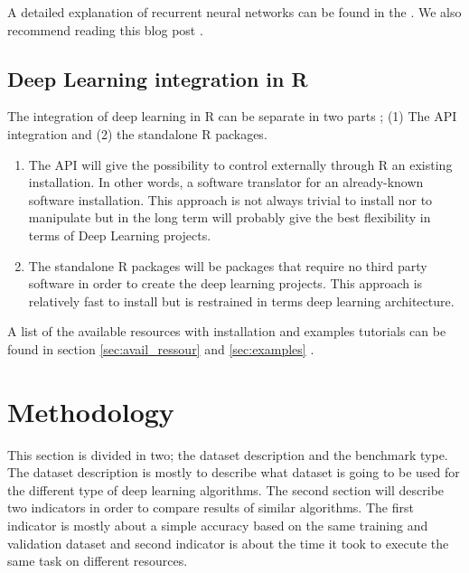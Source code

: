 \documentclass[letter,8pt]{article}\usepackage[]{graphicx}\usepackage[]{color}
\begin{document}
A detailed explanation of recurrent neural networks can be found in the  \cite[Chapter 10]{Goodfellow-et-al-2016}. We also recommend reading this blog post \cite{olah_2015}.


\subsection{Deep Learning integration in R}
\label{sec:deepinR}
The integration of deep learning in R can be separate in two parts ; (1) The API integration and (2) the standalone R packages. 
\begin{enumerate}
\item The API will give the possibility to control externally through R an existing installation. In other words, a software translator for an already-known software installation. This approach is not always trivial to install nor to manipulate but in the long term will probably give the best flexibility in terms of Deep Learning projects.
\item The standalone R packages will be packages that require no third party software in order to create the deep learning projects. This approach is relatively fast to install but is restrained in terms deep learning architecture.
\end{enumerate}
A list of the available resources with installation and examples tutorials can be found in section \ref{sec:avail_ressour} and \ref{sec:examples} .


\section{Methodology}
This section is divided in two;  the dataset description and the benchmark type. The dataset description is mostly to describe what dataset is going to be used for the different type of deep learning algorithms. The second section will describe two indicators in order to compare results of similar algorithms. The first indicator is mostly about a simple accuracy based on the same training and validation dataset and second indicator is about the time it took to execute the same task on different resources.
\end{document}
